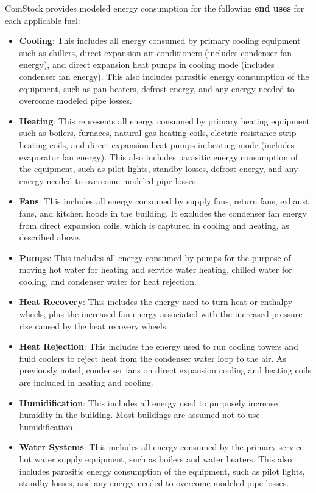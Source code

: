 ComStock provides modeled energy consumption for the following \textbf{end uses} for each applicable fuel:

\begin{itemize}
\item \textbf{Cooling}: This includes all energy consumed by primary cooling equipment such as chillers, direct expansion air conditioners (includes condenser fan energy), and direct expansion heat pumps in cooling mode (includes condenser fan energy). This also includes parasitic energy consumption of the equipment, such as pan heaters, defrost energy, and any energy needed to overcome modeled pipe losses.
\item \textbf{Heating}: This represents all energy consumed by primary heating equipment such as boilers, furnaces, natural gas heating coils, electric resistance strip heating coils, and direct expansion heat pumps in heating mode (includes evaporator fan energy). This also includes parasitic energy consumption of the equipment, such as pilot lights, standby losses, defrost energy, and any energy needed to overcome modeled pipe losses.
\item \textbf{Fans}: This includes all energy consumed by supply fans, return fans, exhaust fans, and kitchen hoods in the building. It excludes the condenser fan energy from direct expansion coils, which is captured in cooling and heating, as described above.
\item \textbf{Pumps}: This includes all energy consumed by pumps for the purpose of moving hot water for heating and service water heating, chilled water for cooling, and condenser water for heat rejection.
\item \textbf{Heat Recovery}: This includes the energy used to turn heat or enthalpy wheels, plus the increased fan energy associated with the increased pressure rise caused by the heat recovery wheels.
\item \textbf{Heat Rejection}: This includes the energy used to run cooling towers and fluid coolers to reject heat from the condenser water loop to the air. As previously noted, condenser fans on direct expansion cooling and heating coils are included in heating and cooling.
\item \textbf{Humidification}: This includes all energy used to purposely increase humidity in the building. Most buildings are assumed not to use humidification.
\item \textbf{Water Systems}: This includes all energy consumed by the primary service hot water supply equipment, such as boilers and water heaters. This also includes parasitic energy consumption of the equipment, such as pilot lights, standby losses, and any energy needed to overcome modeled pipe losses.

\end{itemize}

